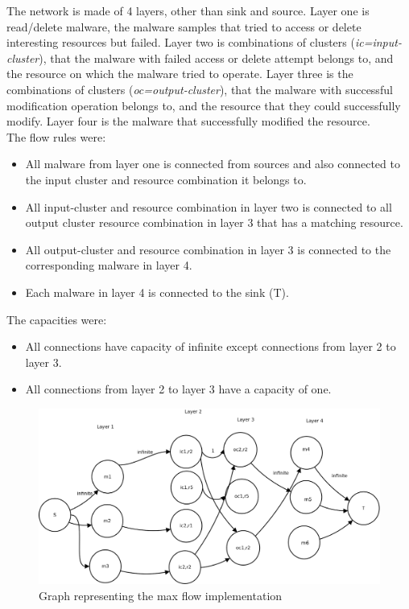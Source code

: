 The network is made of 4 layers, other than sink and source.
Layer one is read/delete malware, the malware samples that tried to access or delete interesting resources but failed.
Layer two is combinations of clusters (\emph{ic=input-cluster}), that the malware with failed access or delete attempt belongs to, and the resource on which the malware tried to operate.
Layer three is the combinations of clusters (\emph{oc=output-cluster}), that the malware with successful modification operation belongs to, and the resource that they could successfully modify.
Layer four is the malware that successfully modified the resource.\\
The flow rules were:
\begin{itemize}
  \item All malware from layer one is connected from sources and also connected to the input cluster and resource combination it belongs to.
  \item All input-cluster and resource combination in layer two is connected to all output cluster resource combination in layer 3 that has a matching resource.
  \item All output-cluster and resource combination in layer 3 is connected to the corresponding malware in layer 4.
  \item Each malware in layer 4 is connected to the sink (T).
\end{itemize}
The capacities were:
\begin{itemize}
  \item All connections have capacity of infinite except connections from layer 2 to layer 3.
  \item All connections from layer 2 to layer 3 have a capacity of one.
\end{itemize}

\begin{figure}[htbp]
  \centering
  \includegraphics[scale=0.23]{figures/maxflow2.png}
  \caption[Max Flow]{Graph representing the max flow implementation}\label{fig:maxflow}
\end{figure}

